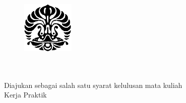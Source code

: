 \begin{titlepage}
	\begin{singlespace*}
	    \begin{center}
	    	\begin{figure}
	            \begin{center}
	                \includegraphics[width=2.5cm]{assets/pics/makara.png}
	            \end{center}
	        \end{figure}
	        \vspace*{-0.25cm}
	        \large
	
	        \vspace*{1.0cm}
	        \large
	        \bo{\Judul} \\[1.0cm]
	
	        \vspace*{2.5 cm}
	        \large
	        \bo{\Type} \\[0.5cm]
	        \normalsize
	        Diajukan sebagai salah satu syarat kelulusan mata kuliah \\
	        Kerja Praktik\\
	
	        \vspace*{2 cm}
	        
	        \large
	        \ifx\blank\npmDua
		        \bo{\PenulisSatu} \\
		        \bo{\npmSatu} \\
		    \else
		    	\bo{\PenulisSatu~/ \npmSatu~/ \ProgramSatu}\\
		    	\bo{\PenulisDua~/ \npmDua~/ \ProgramDua}\\
		    \fi
		    \ifx\blank\npmTiga\else
			    \bo{\PenulisTiga~/ \npmTiga~/ \ProgramTiga}\\
		    \fi
		    
	        \vspace*{4 cm}
	
	        \large
	        \normalsize
	    \end{center}
	\end{singlespace*}
\end{titlepage}
